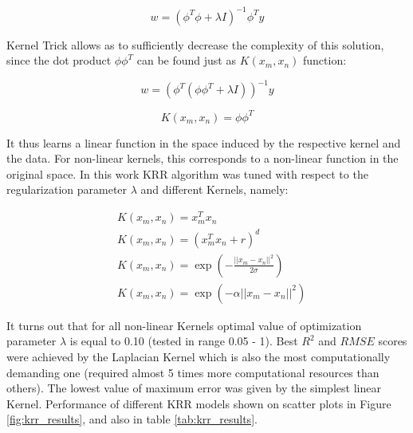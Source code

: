 \begin{equation}
w = (\phi^T\phi+\lambda I)^{-1}\phi^Ty
\end{equation}

Kernel Trick allows as to sufficiently decrease the complexity of this solution, since the dot product $\phi\phi^T$ can be found just as $K(x_m,x_n)$ function:

\begin{equation}
w = (\phi^T(\phi\phi^T+ \lambda I))^{-1} y
\end{equation}

\begin{equation}
K(x_m,x_n) = \phi \phi ^ T
\end{equation}

It thus learns a linear function in the space induced by the respective kernel and the data. For non-linear kernels, this corresponds to a non-linear function in the original space.
In this work KRR algorithm was tuned with respect to the regularization parameter $\lambda$ and different Kernels, namely:

\begin{align}
&K(x_m,x_n) = x_m^T x_n\\
&K(x_m,x_n) = (x_m^T x_n + r) ^ d \\
&K(x_m,x_n) = \exp \left(- \frac{|| x_m - x_n || ^ 2}{2\sigma} \right)\\
&K(x_m,x_n) = \exp \left( -\alpha ||x_m - x_n || ^ 2 \right)
\end{align}


It turns out that for all non-linear Kernels optimal value of optimization parameter $\lambda$ is equal to 0.10 (tested in range 0.05 - 1). 
Best $R^2$ and $RMSE$ scores were achieved by the Laplacian Kernel which is also the most computationally demanding one (required almost 5 times more computational resources than others). 
The lowest value of maximum error was given by the simplest linear Kernel.
Performance of different KRR models shown on scatter plots in Figure \ref{fig:krr_results}, and also in table \ref{tab:krr_results}.

